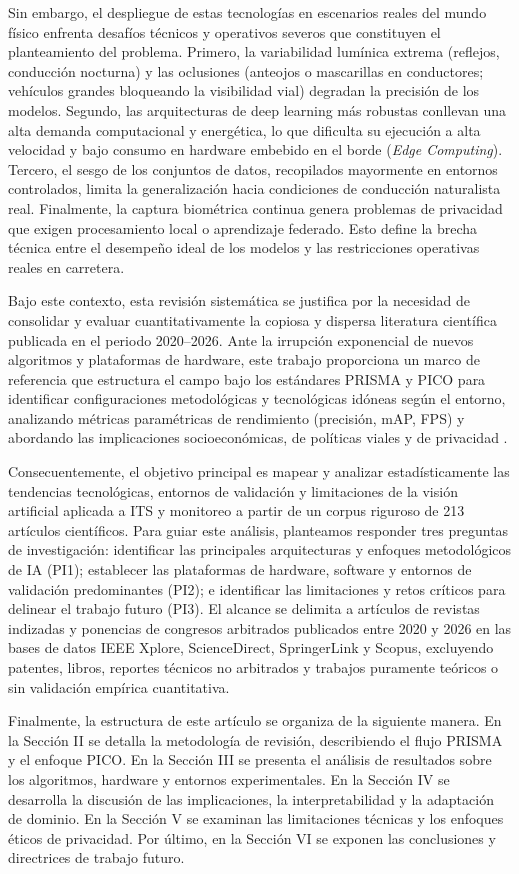 Sin embargo, el despliegue de estas tecnologías en escenarios reales del mundo físico enfrenta desafíos técnicos y operativos severos que constituyen el planteamiento del problema. Primero, la variabilidad lumínica extrema (reflejos, conducción nocturna) y las oclusiones (anteojos o mascarillas en conductores; vehículos grandes bloqueando la visibilidad vial) degradan la precisión de los modelos. Segundo, las arquitecturas de deep learning más robustas conllevan una alta demanda computacional y energética, lo que dificulta su ejecución a alta velocidad y bajo consumo en hardware embebido en el borde (\textit{Edge Computing}). Tercero, el sesgo de los conjuntos de datos, recopilados mayormente en entornos controlados, limita la generalización hacia condiciones de conducción naturalista real. Finalmente, la captura biométrica continua genera problemas de privacidad que exigen procesamiento local o aprendizaje federado. Esto define la brecha técnica entre el desempeño ideal de los modelos y las restricciones operativas reales en carretera.

Bajo este contexto, esta revisión sistemática se justifica por la necesidad de consolidar y evaluar cuantitativamente la copiosa y dispersa literatura científica publicada en el periodo 2020--2026. Ante la irrupción exponencial de nuevos algoritmos y plataformas de hardware, este trabajo proporciona un marco de referencia que estructura el campo bajo los estándares PRISMA y PICO para identificar configuraciones metodológicas y tecnológicas idóneas según el entorno, analizando métricas paramétricas de rendimiento (precisión, mAP, FPS) y abordando las implicaciones socioeconómicas, de políticas viales y de privacidad \cite{kim2025unsupervised, wu2025visual}.

Consecuentemente, el objetivo principal es mapear y analizar estadísticamente las tendencias tecnológicas, entornos de validación y limitaciones de la visión artificial aplicada a ITS y monitoreo a partir de un corpus riguroso de 213 artículos científicos. Para guiar este análisis, planteamos responder tres preguntas de investigación: identificar las principales arquitecturas y enfoques metodológicos de IA (PI1); establecer las plataformas de hardware, software y entornos de validación predominantes (PI2); e identificar las limitaciones y retos críticos para delinear el trabajo futuro (PI3). El alcance se delimita a artículos de revistas indizadas y ponencias de congresos arbitrados publicados entre 2020 y 2026 en las bases de datos IEEE Xplore, ScienceDirect, SpringerLink y Scopus, excluyendo patentes, libros, reportes técnicos no arbitrados y trabajos puramente teóricos o sin validación empírica cuantitativa.

Finalmente, la estructura de este artículo se organiza de la siguiente manera. En la Sección II se detalla la metodología de revisión, describiendo el flujo PRISMA y el enfoque PICO. En la Sección III se presenta el análisis de resultados sobre los algoritmos, hardware y entornos experimentales. En la Sección IV se desarrolla la discusión de las implicaciones, la interpretabilidad y la adaptación de dominio. En la Sección V se examinan las limitaciones técnicas y los enfoques éticos de privacidad. Por último, en la Sección VI se exponen las conclusiones y directrices de trabajo futuro.
